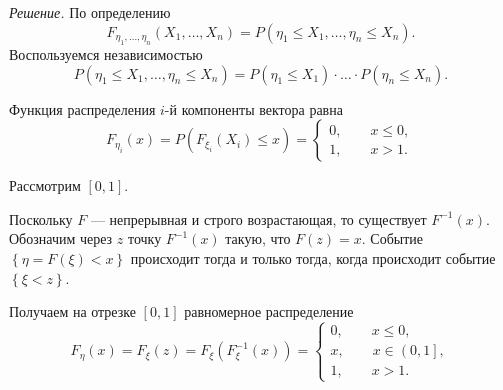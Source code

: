 \textit{Решение.}
По определению
$$F_{ \eta_1, \dotsc, \eta_n} \left( X_1, \dotsc, X_n \right) =
  P \left( \eta_1 \leq X_1, \dotsc, \eta_n \leq X_n \right).$$
Воспользуемся независимостью
$$P \left( \eta_1 \leq X_1, \dotsc, \eta_n \leq X_n \right) =
  P \left( \eta_1 \leq X_1 \right) \cdot \dotsc \cdot P \left( \eta_n \leq X_n \right).$$

Функция распределения $i$-й компоненты вектора равна
$$F_{ \eta_i} \left( x \right) =
  P \left( F_{ \xi_i} \left( X_i \right) \leq x \right) =
  \begin{cases}
    0, \qquad x \leq 0, \\
    1, \qquad x > 1.
  \end{cases}$$

Рассмотрим $ \left[ 0, 1 \right] $.

Поскольку $F$ --- непрерывная и строго возрастающая, то существует $F^{-1} \left( x \right) $.
Обозначим через $z$ точку $F^{-1} \left( x \right) $ такую, что $F \left( z \right) = x$.
Событие $ \left\{ \eta = F \left( \xi \right) < x \right\} $ происходит тогда и только тогда,
когда происходит событие $ \left\{ \xi < z \right\} $.

Получаем на отрезке $ \left[ 0, 1 \right] $ равномерное распределение
$$F_{ \eta } \left( x \right) =
  F_{ \xi } \left( z \right) =
  F_{ \xi } \left( F_{ \xi }^{-1} \left( x \right) \right) =
  \begin{cases}
    0, \qquad x \leq 0, \\
    x, \qquad x \in \left( 0, 1 \right] ,\\
    1, \qquad x > 1.
  \end{cases}$$
